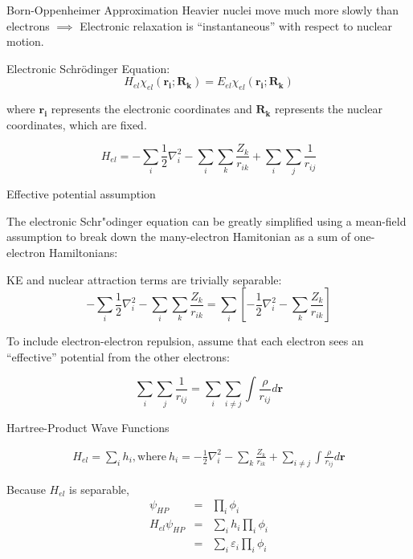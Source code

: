 \documentclass[aspectratio=169]{beamer}
\let \vec \mathbf
\begin{document}
\begin{frame}{Born-Oppenheimer Approximation}
Heavier nuclei move much more slowly than electrons $\implies$ Electronic relaxation is ``instantaneous'' with respect to nuclear motion.

Electronic Schr\"odinger Equation:
\begin{equation*}
    H_{el} \chi_{el}(\vec{r_i}; \vec{R_k}) = E_{el}\chi_{el}(\vec{r_i}; \vec{R_k})
\end{equation*}

where $\vec{r_i}$ represents the electronic coordinates and $\vec{R_k}$ represents the nuclear coordinates, which are fixed.

\begin{equation*}
    H_{el} = -\sum_i \frac{1}{2}\nabla_i^2
    -\sum_i\sum_k \frac{Z_k}{r_{ik}}
    +\sum_i\sum_j \frac{1}{r_{ij}}
\end{equation*}

\end{frame}


\begin{frame}{Effective potential assumption}

The electronic Schr"odinger equation can be greatly simplified using a mean-field assumption to break down the many-electron Hamitonian as a sum of one-electron Hamiltonians:

KE and nuclear attraction terms are trivially separable:
\begin{equation*}
    -\sum_i \frac{1}{2}\nabla_i^2
    -\sum_i\sum_k \frac{Z_k}{r_{ik}}
    = \sum_i \left[ - \frac{1}{2}\nabla_i^2
    -\sum_k \frac{Z_k}{r_{ik}}\right]
\end{equation*}

To include electron-electron repulsion, assume that each electron sees an ``effective'' potential from the other electrons:

\begin{equation*}
    \sum_i\sum_j \frac{1}{r_{ij}}
    = \sum_i \sum_{i \neq j} \int \frac{\rho}{r_{ij}} d \vec{r}
\end{equation*}

\end{frame}

\begin{frame}{Hartree-Product Wave Functions}

\begin{eqnarray*}
    H_{el} = \sum_i h_i, \mbox{where}~h_i = - \frac{1}{2}\nabla_i^2
    -\sum_k \frac{Z_k}{r_{ik}} + \sum_{i \neq j} \int \frac{\rho}{r_{ij}} d \vec{r}
\end{eqnarray*}

Because $H_{el}$ is separable, 
\begin{eqnarray*}
    \psi_{HP} & = & \prod_i \phi_i \\
    H_{el} \psi_{HP} & = & \sum_i h_i \prod_i \phi_i \\
                    & = & \sum_i \varepsilon_i \prod_i \phi_i \\
\end{eqnarray*}

\end{frame}
\end{document}
